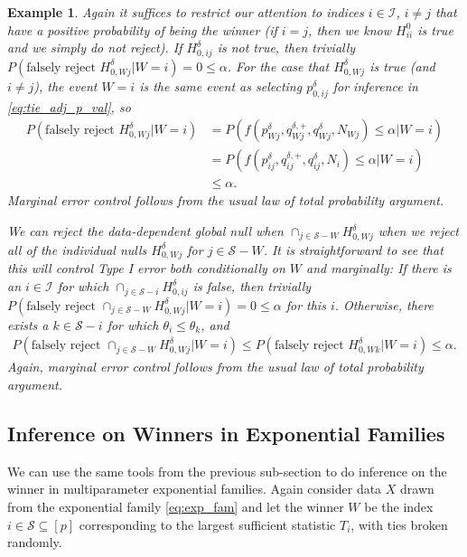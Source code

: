 \documentclass{article}
\newtheorem{example}{Example}
\begin{document}
\begin{appendix}
\begin{example}
    Again it suffices to restrict our attention to indices $i \in \mathcal{I}$, $i \neq j$ that have a positive probability of being the winner (if $i=j$, then we know $H^0_{ii}$ is true and we simply do not reject). If $H^{\delta}_{0, ij}$ is not true, then trivially $P(\text{falsely reject } H^{\delta}_{0, Wj}| W= i) = 0 \leq \alpha$. For the case that $H^{\delta}_{0, Wj}$ is true (and $i \neq j$), the event $W=i$ is the same event as selecting $p_{0, ij}^{\delta}$ for inference in \eqref{eq:tie_adj_p_val}, so 
    \begin{align*}
        P(\text{falsely reject } H^{\delta}_{0, Wj}| W= i) &= P(f(p^{\delta}_{Wj}, q^{\delta, +}_{Wj}, q^{\delta}_{Wj}, N_{Wj}) \leq \alpha | W= i) \\
        &= P(f(p^{\delta}_{ij}, q^{\delta, +}_{ij}, q^{\delta}_{ij}, N_i) \leq \alpha | W = i) \\
        &\leq \alpha. 
    \end{align*}
    Marginal error control follows from the usual law of total probability argument.

    We can reject the data-dependent global null when  $\cap_{j \in \mathcal{S} - W} H^{\delta}_{0, Wj}$ when we reject all of the individual nulls $H^{\delta}_{0, Wj}$ for $j \in \mathcal{S} - W$. It is straightforward to see that this will control Type I error both conditionally on $W$ and marginally: If there is an $i \in \mathcal{I}$ for which $\cap_{j \in \mathcal{S} - i} H^{\delta}_{0, ij}$ is false, then trivially $P(\text{falsely reject } \cap_{j \in \mathcal{S} - W} H^{\delta}_{0, Wj}| W= i) = 0 \leq \alpha$ for this $i$. Otherwise, there exists a $k \in \mathcal{S} - i$ for which $\theta_i \leq \theta_k$, and 
    \begin{align*}
        P(\text{falsely reject } \cap_{j \in \mathcal{S} - W} H^{\delta}_{0, Wj}| W= i) \leq P(\text{falsely reject } H^{\delta}_{0, Wk}| W= i) \leq \alpha.\
    \end{align*} 
    Again, marginal error control follows from the usual law of total probability argument.
\end{example}

\iffalse
\subsection{Inference on Winners in Exponential Families}

We can use the same tools from the previous sub-section  to do inference on the winner in multiparameter exponential families. Again consider data $X$ drawn from the exponential family \eqref{eq:exp_fam} and let the winner $W$ be the index $i \in \mathcal{S} \subseteq [p]$ corresponding to the largest sufficient statistic $T_i$, with ties broken randomly.


\end{appendix}
\end{document}
